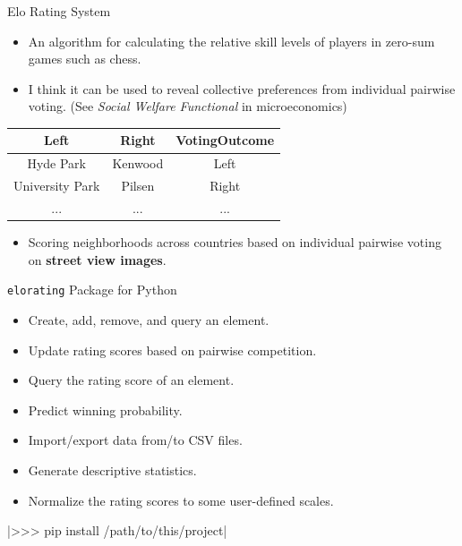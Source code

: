 \documentclass{beamer}
\begin{document}
\begin{frame}{Elo Rating System}
\begin{itemize}
    \item An algorithm for calculating the relative skill levels of players in zero-sum games such as chess.
    \item I think it can be used to reveal collective preferences from individual pairwise voting. (See \textit{Social Welfare Functional} in microeconomics)
\end{itemize}

\begin{center}
\begin{tabular}{ c|c|c }
Left & Right & VotingOutcome\\
\hline
 Hyde Park & Kenwood & Left \\ 
 University Park & Pilsen & Right \\
 ... & ... & ...
\end{tabular}
\end{center}

\begin{itemize}
    \item Scoring neighborhoods across countries based on individual pairwise voting  on \textbf{street view images}. 
\end{itemize}
    
\end{frame}

\begin{frame}{\texttt{elorating} Package for Python}
    \begin{itemize}
        \item Create, add, remove, and query an element. 
        \item Update rating scores based on pairwise competition.
        \item Query the rating score of an element.
        \item Predict winning probability.
        \item Import/export data from/to CSV files. 
        \item Generate descriptive statistics.
        \item Normalize the rating scores to some user-defined scales.
    \end{itemize}

\begin{example}
     |>>> pip install /path/to/this/project|
\end{example}


\end{frame}
\end{document}

